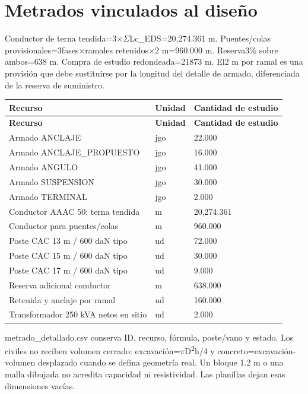 \setcounter{section}{5}
\section{Metrados vinculados al diseño}
Conductor de terna tendida=3\ensuremath{\times}\ensuremath{\Sigma}Lc\_\allowbreak{}EDS=20,274.361 m. Puentes/colas provisionales=3fases\ensuremath{\times}ramales retenidos\ensuremath{\times}2 m=960.000 m. Reserva3\% sobre ambos=638 m. Compra de estudio redondeada=21873 m. El2 m por ramal es una provisión que debe sustituirse por la longitud del detalle de armado, diferenciada de la reserva de suministro.

\begingroup\small\setlength{\LTpre}{4pt}\setlength{\LTpost}{6pt}
\begin{longtable}{*{3}{L{\dimexpr\linewidth/3-2\tabcolsep\relax}}}
\toprule
\textbf{Recurso} & \textbf{Unidad} & \textbf{Cantidad de estudio} \\ \midrule
\endfirsthead
\toprule
\textbf{Recurso} & \textbf{Unidad} & \textbf{Cantidad de estudio} \\ \midrule
\endhead
Armado ANCLAJE & jgo & 22.000 \\
Armado ANCLAJE\_\allowbreak{}PROPUESTO & jgo & 16.000 \\
Armado ANGULO & jgo & 41.000 \\
Armado SUSPENSION & jgo & 30.000 \\
Armado TERMINAL & jgo & 2.000 \\
Conductor AAAC 50: terna tendida & m & 20,274.361 \\
Conductor para puentes/colas & m & 960.000 \\
Poste CAC 13 m / 600 daN tipo & ud & 72.000 \\
Poste CAC 15 m / 600 daN tipo & ud & 30.000 \\
Poste CAC 17 m / 600 daN tipo & ud & 9.000 \\
Reserva adicional conductor & m & 638.000 \\
Retenida y anclaje por ramal & ud & 160.000 \\
Transformador 250 kVA netos en sitio & ud & 2.000 \\
\bottomrule\end{longtable}\endgroup

metrado\_\allowbreak{}detallado.csv conserva ID, recurso, fórmula, poste/vano y estado. Los civiles no reciben volumen cerrado: excavación=\ensuremath{\pi}D\textsuperscript{2}h/4 y concreto=excavación-volumen desplazado cuando se defina geometría real. Un bloque 1.2 m o una malla dibujada no acredita capacidad ni resistividad. Las planillas dejan esas dimensiones vacías.

